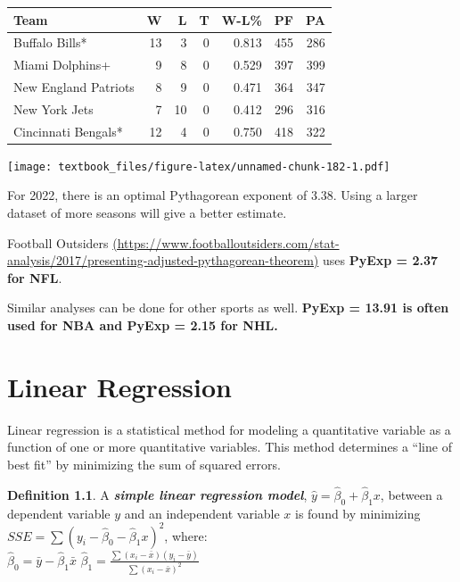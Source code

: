 \documentclass[
  11pt,
]{book}
\newenvironment{Shaded}{\begin{snugshade}}{\end{snugshade}}
\newcommand{\AttributeTok}[1]{\textcolor[rgb]{0.77,0.63,0.00}{#1}}
\newcommand{\DecValTok}[1]{\textcolor[rgb]{0.00,0.00,0.81}{#1}}
\newcommand{\FunctionTok}[1]{\textcolor[rgb]{0.00,0.00,0.00}{#1}}
\newcommand{\NormalTok}[1]{#1}
\newcommand{\SpecialCharTok}[1]{\textcolor[rgb]{0.00,0.00,0.00}{#1}}
\newcommand{\StringTok}[1]{\textcolor[rgb]{0.31,0.60,0.02}{#1}}
\theoremstyle{definition}
\newtheorem{definition}{Definition}[chapter]
\theoremstyle{definition}
\theoremstyle{definition}
\theoremstyle{definition}
\theoremstyle{remark}
\begin{document}
\begin{tabular}{lrrrrrr}
\toprule
Team & W & L & T & W-L\% & PF & PA\\
\midrule
Buffalo Bills* & 13 & 3 & 0 & 0.813 & 455 & 286\\
Miami Dolphins+ & 9 & 8 & 0 & 0.529 & 397 & 399\\
New England Patriots & 8 & 9 & 0 & 0.471 & 364 & 347\\
New York Jets & 7 & 10 & 0 & 0.412 & 296 & 316\\
Cincinnati Bengals* & 12 & 4 & 0 & 0.750 & 418 & 322\\
\bottomrule
\end{tabular}

\begin{Shaded}
\end{Shaded}

\texttt{[image: textbook\_files/figure-latex/unnamed-chunk-182-1.pdf]}

For 2022, there is an optimal Pythagorean exponent of 3.38. Using a larger dataset of more seasons will give a better estimate.

Football Outsiders \href{https://www.footballoutsiders.com/stat-analysis/2017/presenting-adjusted-pythagorean-theorem}{(https://www.footballoutsiders.com/stat-analysis/2017/presenting-adjusted-pythagorean-theorem)} uses \textbf{PyExp = 2.37 for NFL}.

Similar analyses can be done for other sports as well. \textbf{PyExp = 13.91 is often used for NBA and PyExp = 2.15 for NHL.}

\hypertarget{linear-regression}{%
\chapter{Linear Regression}\label{linear-regression}}

Linear regression is a statistical method for modeling a quantitative variable as a function of one or more quantitative variables. This method determines a ``line of best fit'' by minimizing the sum of squared errors.

\begin{definition}
A \textbf{\emph{simple linear regression model}}, \(\hat{y} = \hat{\beta}_0 + \hat{\beta}_1 x\), between a dependent variable \(y\) and an independent variable \(x\) is found by minimizing \(SSE=\sum(y_i-\hat{\beta}_0-\hat{\beta}_1x)^2\), where:\\

\(\hat{\beta}_0 = \bar{y} - \hat{\beta}_1 \bar{x}\) \hspace{0.1in} \(\hat{\beta}_1 = \frac{\sum(x_i-\bar{x})(y_i-\bar{y})}{\sum(x_i-\bar{x})^2}\)\\

\end{definition}
\end{document}
